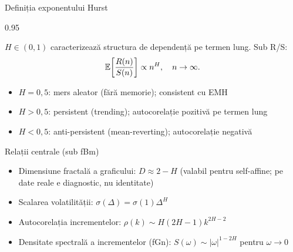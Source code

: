 \documentclass[9pt, aspectratio=169, t]{beamer}
\begin{document}
\begin{frame}[shrink=15]{Definiția exponentului Hurst}
\begin{cminipage}{0.95\textwidth}
\begin{defn}
$H\in(0,1)$ caracterizează structura de dependență pe termen lung. Sub R/S:
\[
    \mathbb{E}\!\left[\frac{R(n)}{S(n)}\right]\propto n^H,\quad n\to\infty.
\]
\end{defn}
\begin{itemize}\setlength{\itemsep}{0pt}
    \item $H=0{,}5$: mers aleator (fără memorie); consistent cu EMH
    \item $H>0{,}5$: persistent (trending); autocorelație pozitivă pe termen lung
    \item $H<0{,}5$: anti-persistent (mean-reverting); autocorelație negativă
\end{itemize}
\vspace{0.1cm}
\begin{exampleblock}{Relații centrale (sub fBm)}
\begin{itemize}\setlength{\itemsep}{0pt}
    \item Dimensiune fractală a graficului: $\boxed{D\approx 2-H}$ \quad (valabil pentru self-affine; pe date reale e diagnostic, nu identitate)
    \item Scalarea volatilității: $\sigma(\Delta)=\sigma(1)\Delta^H$
    \item Autocorelația incrementelor: $\rho(k)\sim H(2H-1)k^{2H-2}$
    \item Densitate spectrală a incrementelor (fGn): $S(\omega)\sim|\omega|^{1-2H}$ pentru $\omega\to 0$
\end{itemize}
\end{exampleblock}
\end{cminipage}
\end{frame}
\end{document}
